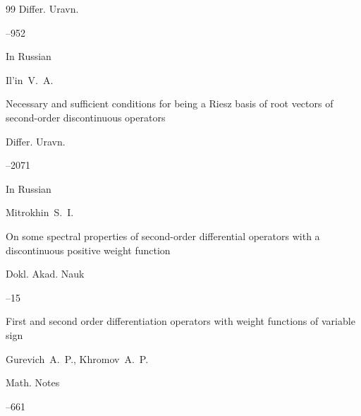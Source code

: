 \begin{thebibliography}{99}
\jour Differ. Uravn.




--952








\lang In Russian

\by Il'in~V.~A.

\paper Necessary and sufficient conditions for being a Riesz basis of root vectors of second-order discontinuous operators

\jour Differ. Uravn.




--2071








\lang In Russian

\by Mitrokhin~S.~I.

\paper On some spectral properties of second-order differential operators with a discontinuous positive weight function

\jour Dokl. Akad. Nauk 




--15






\paper First and second order differentiation operators with weight functions of variable sign

\by Gurevich~A.~P.,  Khromov~A.~P.

\jour Math. Notes




--661





\end{thebibliography}
